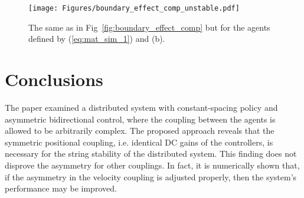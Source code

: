 \documentclass[10pt,twocolumn,twoside]{IEEEtran}
\theoremstyle{definition}
\newcommand{\revA}{Black}
\begin{document}
\begin{figure}[ht]
 \centering
  \texttt{[image: Figures/boundary\_effect\_comp\_unstable.pdf]}
  \caption{{\color{\revA}The same as in Fig~\ref{fig:boundary_effect_comp} but for the agents defined by (\ref{eq:mat_sim_1}) and (b).}}
  \label{fig:boundary_effect_comp_unstable}
\end{figure}







\section{Conclusions}
The paper examined a distributed system with constant-spacing policy and asymmetric bidirectional control, where the coupling between the agents is allowed to be arbitrarily complex. The proposed approach reveals that the symmetric positional coupling, i.e. identical DC gains of the controllers, is necessary for the string stability of the distributed system. This finding does not disprove the asymmetry for other couplings. In fact, it is numerically shown that, if the asymmetry in the velocity coupling is adjusted properly, then the system's performance may be improved.













\end{document}

